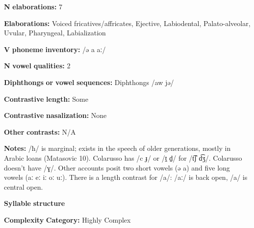 \begin{styleBody}
\textbf{N} \textbf{elaborations:} 7
\end{styleBody}

\begin{styleBody}
\textbf{Elaborations:} Voiced fricatives/affricates, Ejective, Labiodental, Palato-alveolar, Uvular, Pharyngeal, Labialization
\end{styleBody}

\begin{styleBody}
\textbf{V} \textbf{phoneme} \textbf{inventory:} /ə a aː/
\end{styleBody}

\begin{styleBody}
\textbf{N} \textbf{vowel} \textbf{qualities:} 2
\end{styleBody}

\begin{styleBody}
\textbf{Diphthongs} \textbf{or} \textbf{vowel} \textbf{sequences:} Diphthongs /aw jə/
\end{styleBody}

\begin{styleBody}
\textbf{Contrastive} \textbf{length:} Some
\end{styleBody}

\begin{styleBody}
\textbf{Contrastive} \textbf{nasalization:} None
\end{styleBody}

\begin{styleBody}
\textbf{Other} \textbf{contrasts:} N/A
\end{styleBody}

\begin{styleBody}
\textbf{Notes:} /ħ/ is marginal; exists in the speech of older generations, mostly in Arabic loans (Matasovic 10). Colarusso has /c ɟ/ or /t̠ d̠/ for /t͡ʃ d͡ʒ/. Colarusso doesn’t have /ɣ/. Other accounts posit two short vowels (ə a) and five long vowels (aː eː iː oː uː). There is a length contrast for /a/: /aː/ is back open, /a/ is central open.
\end{styleBody}

\begin{styleBody}
\textbf{Syllable} \textbf{structure}
\end{styleBody}

\begin{styleBody}
\textbf{Complexity} \textbf{Category:} Highly Complex
\end{styleBody}

